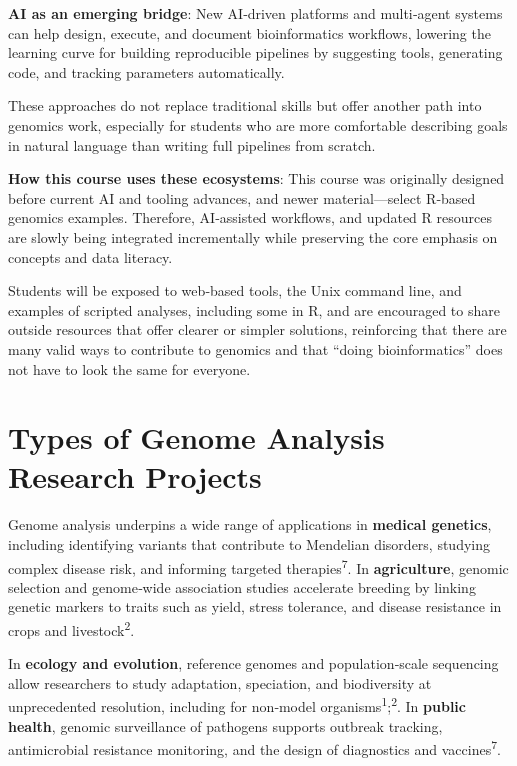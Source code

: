 \documentclass[
  letterpaper,
  DIV=11,
  numbers=noendperiod]{scrreprt}
\begin{document}
\textbf{AI as an emerging bridge}: New AI‑driven platforms and
multi‑agent systems can help design, execute, and document
bioinformatics workflows, lowering the learning curve for building
reproducible pipelines by suggesting tools, generating code, and
tracking parameters automatically.

These approaches do not replace traditional skills but offer another
path into genomics work, especially for students who are more
comfortable describing goals in natural language than writing full
pipelines from scratch.

\textbf{How this course uses these ecosystems}: This course was
originally designed before current AI and tooling advances, and newer
material---select R‑based genomics examples. Therefore, AI‑assisted
workflows, and updated R resources are slowly being integrated
incrementally while preserving the core emphasis on concepts and data
literacy.

Students will be exposed to web‑based tools, the Unix command line, and
examples of scripted analyses, including some in R, and are encouraged
to share outside resources that offer clearer or simpler solutions,
reinforcing that there are many valid ways to contribute to genomics and
that ``doing bioinformatics'' does not have to look the same for
everyone.

\section{Types of Genome Analysis Research
Projects}\label{types-of-genome-analysis-research-projects}

Genome analysis underpins a wide range of applications in
\textbf{medical genetics}, including identifying variants that
contribute to Mendelian disorders, studying complex disease risk, and
informing targeted therapies\textsuperscript{7}. In
\textbf{agriculture}, genomic selection and genome‑wide association
studies accelerate breeding by linking genetic markers to traits such as
yield, stress tolerance, and disease resistance in crops and
livestock\textsuperscript{2}.

In \textbf{ecology and evolution}, reference genomes and
population‑scale sequencing allow researchers to study adaptation,
speciation, and biodiversity at unprecedented resolution, including for
non‑model organisms\textsuperscript{1};\textsuperscript{2}. In
\textbf{public health}, genomic surveillance of pathogens supports
outbreak tracking, antimicrobial resistance monitoring, and the design
of diagnostics and vaccines\textsuperscript{7}.
\end{document}
